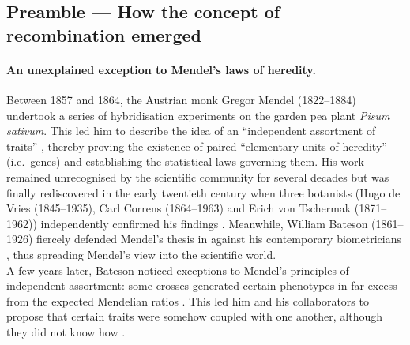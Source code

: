\subsection*{Preamble — How the concept of recombination emerged}

\paragraph{An unexplained exception to Mendel's laws of heredity.}
Between 1857 and 1864, the Austrian monk Gregor Mendel (1822--1884) undertook a series of hybridisation experiments on the garden pea plant \textit{Pisum sativum}. This led him to describe the idea of an “independent assortment of traits” \citep{mendel1996experiments}, thereby proving the existence of paired “elementary units of heredity” (i.e.\ genes) and establishing the statistical laws governing them.
His work remained unrecognised by the scientific community for several decades but was finally rediscovered in the early twentieth century when three botanists (Hugo de Vries (1845--1935), Carl Correns (1864--1963) and Erich von Tschermak (1871--1962)) independently confirmed his findings \citep{dunn2003gregor}.
Meanwhile, William Bateson (1861--1926) fiercely defended Mendel's thesis in \textit{} \citep{bateson1902mendel} against his contemporary biometricians \citep[reviewed in][]{bateson2002william}, thus spreading Mendel's view into the scientific world.\\

A few years later, Bateson noticed exceptions to Mendel's principles of independent assortment: some crosses generated certain phenotypes in far excess from the expected Mendelian ratios \citep{bateson1905experimentalpea}. This led him and his collaborators to propose that certain traits were somehow coupled with one another, although they did not know how \citep{bateson1905experimental}. 




